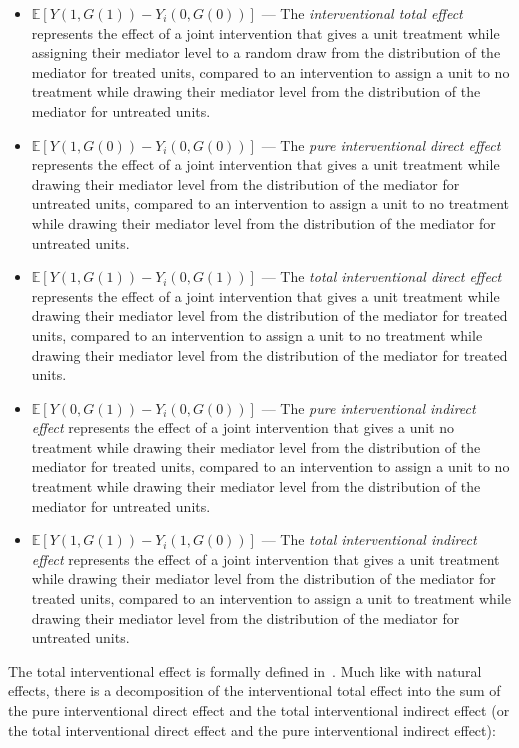 \begin{itemize}[noitemsep,topsep=0pt]
\item  $\mathbb{E}[Y(1,G(1)) - Y_{i}(0,G(0))]$ --- The \textit{interventional total effect} 
represents the effect of a joint intervention that gives a unit treatment while assigning their mediator 
level to a random draw from the distribution of the mediator for treated units, compared to an intervention
to assign a unit to no treatment while drawing their mediator level from the distribution of the mediator for 
untreated units. 
\item  $\mathbb{E}[Y(1,G(0)) - Y_{i}(0,G(0))]$ --- The \textit{pure interventional direct effect} 
represents the effect of a joint intervention that gives a unit treatment while drawing their mediator level 
from the distribution of the mediator for untreated units, compared to an intervention
to assign a unit to no treatment while drawing their mediator level from the distribution of the mediator for 
untreated units. 
\item  $\mathbb{E}[Y(1,G(1)) - Y_{i}(0,G(1))]$ --- The \textit{total interventional direct effect} 
represents the effect of a joint intervention that gives a unit treatment while drawing their mediator level 
from the distribution of the mediator for treated units, compared to an intervention
to assign a unit to no treatment while drawing their mediator level from the distribution of the mediator for 
treated units. 
\item  $\mathbb{E}[Y(0,G(1)) - Y_{i}(0,G(0))]$ --- The \textit{pure interventional indirect effect} 
represents the effect of a joint intervention that gives a unit no treatment while drawing their mediator level 
from the distribution of the mediator for treated units, compared to an intervention
to assign a unit to no treatment while drawing their mediator level from the distribution of the mediator for 
untreated units.
\item  $\mathbb{E}[Y(1,G(1)) - Y_{i}(1,G(0))]$ --- The \textit{total interventional indirect effect} 
represents the effect of a joint intervention that gives a unit treatment while drawing their mediator level 
from the distribution of the mediator for treated units, compared to an intervention
to assign a unit to treatment while drawing their mediator level from the distribution of the mediator for 
untreated units.
\end{itemize}

The total interventional effect is formally defined in~\cite{linvanderweele2017}. 
Much like with natural effects, there is a decomposition of the interventional total effect into the sum of the 
pure interventional direct effect and the total interventional indirect effect (or the total interventional
direct effect and the pure interventional indirect effect): 

